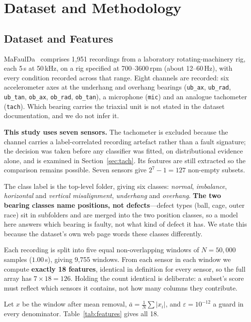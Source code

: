 \documentclass[conference]{IEEEtran}
\begin{document}
\section{Dataset and Methodology}

\subsection{Dataset and Features}

MaFaulDa~\cite{mafaulda} comprises 1{,}951 recordings from a laboratory
rotating-machinery rig, each 5\,s at 50\,kHz, on a rig specified at
700--3600\,rpm (about 12--60\,Hz), with every condition recorded across that
range. Eight channels are recorded: six accelerometer axes at the underhang and
overhang bearings (\texttt{ub\_ax}, \texttt{ub\_rad}, \texttt{ub\_tan},
\texttt{ob\_ax}, \texttt{ob\_rad}, \texttt{ob\_tan}), a microphone
(\texttt{mic}) and an analogue tachometer (\texttt{tach}). Which bearing
carries the triaxial unit is not stated in the dataset documentation, and we do
not infer it.

\textbf{This study uses seven sensors.} The tachometer is excluded because the
channel carries a label-correlated recording artefact rather than a fault
signature; the decision was taken before any classifier was fitted, on
distributional evidence alone, and is examined in Section~\ref{sec:tach}. Its
features are still extracted so the comparison remains possible. Seven sensors
give $2^7-1=127$ non-empty subsets.

The class label is the top-level folder, giving six classes: \emph{normal},
\emph{imbalance}, \emph{horizontal} and \emph{vertical misalignment},
\emph{underhang} and \emph{overhang}. \textbf{The two bearing classes name
positions, not defects}---defect types (ball, cage, outer race) sit in
subfolders and are merged into the two position classes, so a model here
answers which bearing is faulty, not what kind of defect it has. We state this
because the dataset's own web page words these classes differently.

Each recording is split into five equal non-overlapping windows of
$N=50{,}000$ samples ($1.00$\,s), giving 9{,}755 windows. From each sensor in
each window we compute \textbf{exactly 18 features}, identical in definition
for every sensor, so the full array has $7\times18=126$. Holding the count
identical is deliberate: a subset's score must reflect which sensors it
contains, not how many columns they contribute.

Let $x$ be the window after mean removal, $\bar{a}=\frac{1}{N}\sum|x_i|$, and
$\varepsilon=10^{-12}$ a guard in every denominator. Table~\ref{tab:features}
gives all 18.
\end{document}

